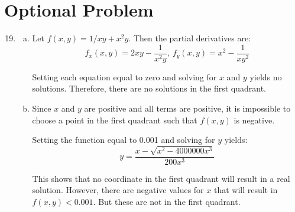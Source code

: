 \documentclass{article}
\begin{document}
\section{Optional Problem}

\begin{enumerate}[1.]
  \setcounter{enumi}{18}
  \item \begin{enumerate}[a.]
    \item Let $f(x, y) = 1/xy + x^{2}y$. Then the partial derivatives are:
      $$ f_{x}(x, y) = 2 x y - \frac{ 1 }{ x^{2} y },\ f_{y}(x, y) = x^{2} -
      \frac{ 1 }{ x y^{2} } $$

      Setting each equation equal to zero and solving for $x$ and $y$ yields no
      solutions. Therefore, there are no solutions in the first quadrant.
    \item Since $x$ and $y$ are positive and all terms are positive, it is
      impossible to choose a point in the first quadrant such that $f(x, y)$ is
      negative.

      \bigbreak

      Setting the function equal to 0.001 and solving for $y$ yields:
      $$ y = \frac{ x - \sqrt{x^{2} - 4000000 x^{3}} }{ 200 x^{3} } $$

      This shows that no coordinate in the first quadrant will result in a real
      solution. However, there are negative values for $x$ that will result in
      $f(x, y) < 0.001$. But these are not in the first quadrant.
  \end{enumerate}
\end{enumerate}
\end{document}
